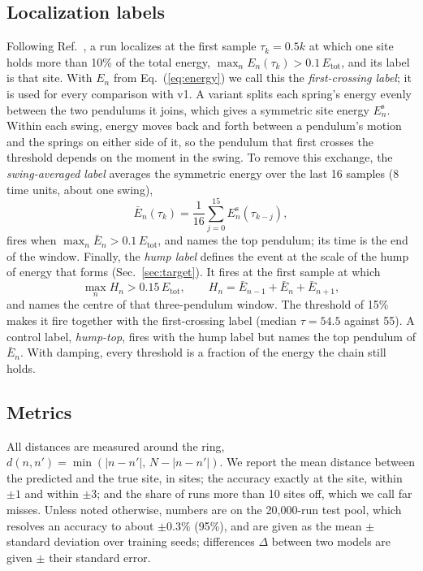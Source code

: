 \documentclass[11pt]{article}
\newcommand{\Etot}{E_{\mathrm{tot}}}
\begin{document}
\subsection{Localization labels}
\label{sec:labels}

Following Ref.~\cite{mittal2026jand}, a run localizes at the first sample $\tau_k=0.5k$ at which one site holds more than 10\% of the total energy, $\max_n E_n(\tau_k)>0.1\,\Etot$, and its label is that site. With $E_n$ from Eq.~(\ref{eq:energy}) we call this the \emph{first-crossing label}; it is used for every comparison with v1. A variant splits each spring's energy evenly between the two pendulums it joins, which gives a symmetric site energy $E^{\mathrm{s}}_n$. Within each swing, energy moves back and forth between a pendulum's motion and the springs on either side of it, so the pendulum that first crosses the threshold depends on the moment in the swing. To remove this exchange, the \emph{swing-averaged label} averages the symmetric energy over the last 16 samples (8 time units, about one swing),
\begin{equation}
\label{eq:avg}
\bar E_n(\tau_k) = \frac{1}{16}\sum_{j=0}^{15} E^{\mathrm{s}}_n(\tau_{k-j}) ,
\end{equation}
fires when $\max_n\bar E_n>0.1\,\Etot$, and names the top pendulum; its time is the end of the window. Finally, the \emph{hump label} defines the event at the scale of the hump of energy that forms (Sec.~\ref{sec:target}). It fires at the first sample at which
\begin{equation}
\label{eq:hump}
\max_n H_n > 0.15\,\Etot , \qquad H_n = \bar E_{n-1} + \bar E_n + \bar E_{n+1} ,
\end{equation}
and names the centre of that three-pendulum window. The threshold of 15\% makes it fire together with the first-crossing label (median $\tau=54.5$ against 55). A control label, \emph{hump-top}, fires with the hump label but names the top pendulum of $\bar E_n$. With damping, every threshold is a fraction of the energy the chain still holds.

\subsection{Metrics}

All distances are measured around the ring, $d(n,n')=\min(|n-n'|,\,N-|n-n'|)$. We report the mean distance between the predicted and the true site, in sites; the accuracy exactly at the site, within $\pm1$ and within $\pm3$; and the share of runs more than 10 sites off, which we call far misses. Unless noted otherwise, numbers are on the 20,000-run test pool, which resolves an accuracy to about $\pm0.3\%$ (95\%), and are given as the mean $\pm$ standard deviation over training seeds; differences $\Delta$ between two models are given $\pm$ their standard error.
\end{document}
